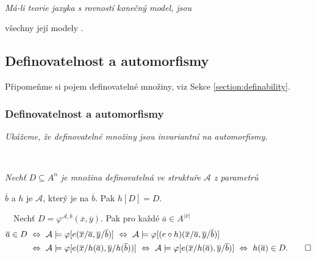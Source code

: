     {\bf {}}\ \ {\it Má-li  teorie jazyka s rovností konečný model, jsou
    \vspace{0.5mm}
    
    všechny její modely .}
    

\subsection{Definovatelnost a automorfismy}\todo

Připomeňme si pojem definovatelné množiny, viz Sekce \ref{section:definability}.


\subsubsection*{Definovatelnost a automorfismy}
    
    {\it Ukážeme, že definovatelné množiny jsou invariantní na automorfismy.}
    \medskip
    
    {\bf {}}\ \ {\it Nechť $D\subseteq A^n$ je množina definovatelná ve struktuře $\mathcal{A}$ z parametrů
    \smallskip
    
    $\overline{b}$ a $h$ je  $\mathcal{A}$, který je  na $\overline{b}$. Pak $h[D]=D$.}
    \medskip
    
    {\it {}}\ \ Nechť $D=\varphi^{\mathcal{A},\overline{b}}(\overline{x},\overline{y})$. Pak pro každé $\overline{a}\in A^{|\overline{x}|}$
    \vspace{-1mm}
    \begin{align*}\overline{a}\in D\ &\Leftrightarrow\ \mathcal{A}\models \varphi[e(\overline{x}/\overline{a},\overline{y}/\overline{b})]\ \Leftrightarrow\  \mathcal{A}\models \varphi[(e\circ h)(\overline{x}/\overline{a},\overline{y}/\overline{b})]\\
    &\Leftrightarrow\ \mathcal{A}\models \varphi[e(\overline{x}/h(\overline{a}),\overline{y}/h(\overline{b}))]\ \Leftrightarrow\ \mathcal{A}\models \varphi[e(\overline{x}/h(\overline{a}),\overline{y}/\overline{b})]\ \Leftrightarrow\ h(\overline{a})\in D. \qed
    \end{align*}
    \vspace{-4mm}
    
    \medskip
    
